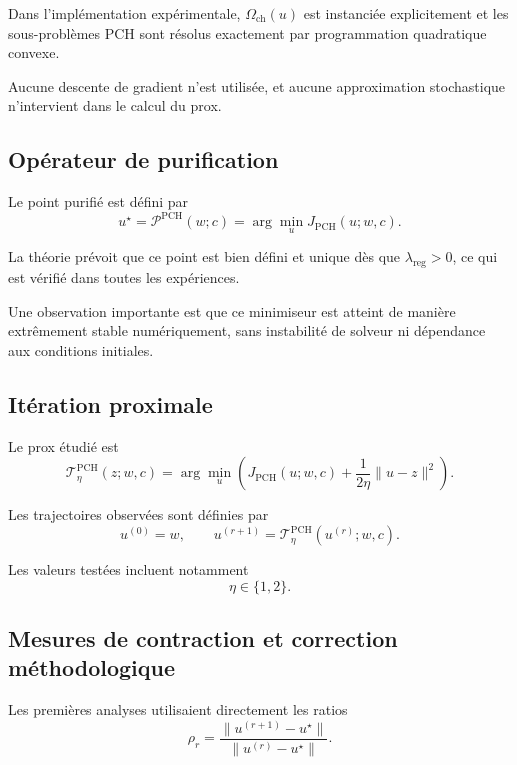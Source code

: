 \documentclass[11pt,a4paper]{article}
\newcommand{\1}{\mathbf 1}
\begin{document}
Dans l’implémentation expérimentale, \(\Omega_{\mathrm{ch}}(u)\) est instanciée explicitement et les sous-problèmes PCH sont résolus exactement par programmation quadratique convexe.

Aucune descente de gradient n’est utilisée, et aucune approximation stochastique n’intervient dans le calcul du prox.

\subsection{Opérateur de purification}

Le point purifié est défini par
\[
u^\star = \mathcal P^{\mathrm{PCH}}(w;c)
=
\arg\min_u J_{\mathrm{PCH}}(u;w,c).
\]

La théorie prévoit que ce point est bien défini et unique dès que \(\lambda_{\mathrm{reg}}>0\), ce qui est vérifié dans toutes les expériences.

Une observation importante est que ce minimiseur est atteint de manière extrêmement stable numériquement, sans instabilité de solveur ni dépendance aux conditions initiales.

\subsection{Itération proximale}

Le prox étudié est
\[
\mathcal T_\eta^{\mathrm{PCH}}(z;w,c)
=
\arg\min_u
\left(
J_{\mathrm{PCH}}(u;w,c)
+
\frac1{2\eta}\|u-z\|^2
\right).
\]

Les trajectoires observées sont définies par
\[
u^{(0)} = w,
\qquad
u^{(r+1)} = \mathcal T_\eta^{\mathrm{PCH}}(u^{(r)};w,c).
\]

Les valeurs testées incluent notamment
\[
\eta \in \{1,2\}.
\]

\subsection{Mesures de contraction et correction méthodologique}

Les premières analyses utilisaient directement les ratios
\[
\rho_r
=
\frac{\|u^{(r+1)}-u^\star\|}{\|u^{(r)}-u^\star\|}.
\]
\end{document}
